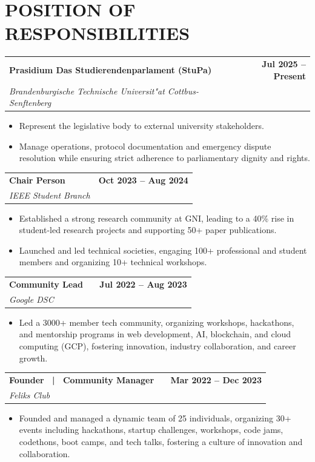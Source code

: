 \documentclass[a4paper,11pt]{article}
\makeatletter
\newcommand{\entryheader}[4]{%
  \begin{tabularx}{\textwidth}{@{}>{\RaggedRight\arraybackslash}X r@{}}
    \textbf{#1} & \textbf{#2} \\
    \textit{#3} & \textit{#4} \\
  \end{tabularx}%
}
\newenvironment{entrybullets}{%
  \begin{minipage}[t]{0.77\textwidth}
    \begin{itemize}[leftmargin=*,label=\textbullet,align=left]
}{%
    \end{itemize}
  \end{minipage}
}
\newcommand{\extlink}{\raisebox{0.2ex}{\scriptsize\faExternalLink*}}
\makeatother
\begin{document}
\section*{POSITION OF RESPONSIBILITIES}
\entryheader{Prasidium Das Studierendenparlament (StuPa)}{Jul 2025 -- Present}{Brandenburgische Technische Universit"at Cottbus-Senftenberg}{}
\begin{entrybullets}
  \item Represent the legislative body to external university stakeholders.
  \item Manage operations, protocol documentation and emergency dispute resolution while ensuring strict adherence to parliamentary dignity and rights.
\end{entrybullets}

\vspace{0.25cm}
\entryheader{Chair Person}{Oct 2023 -- Aug 2024}{IEEE Student Branch}{}
\begin{entrybullets}
  \item Established a strong research community at GNI, leading to a 40\% rise in student-led research projects and supporting 50+ paper publications.
  \item Launched and led technical societies, engaging 100+ professional and student members and organizing 10+ technical workshops.
\end{entrybullets}

\vspace{0.25cm}
\newpage
\thispagestyle{secondpage}

\entryheader{Community Lead \ \extlink}{Jul 2022 -- Aug 2023}{Google DSC}{}
\begin{entrybullets}
  \item Led a 3000+ member tech community, organizing workshops, hackathons, and mentorship programs in web development, AI, blockchain, and cloud computing (GCP), fostering innovation, industry collaboration, and career growth.
\end{entrybullets}

\vspace{0.25cm}
\entryheader{Founder \ | \ Community Manager \ \extlink}{Mar 2022 -- Dec 2023}{Feliks Club}{}
\begin{entrybullets}
  \item Founded and managed a dynamic team of 25 individuals, organizing 30+ events including hackathons, startup challenges, workshops, code jams, codethons, boot camps, and tech talks, fostering a culture of innovation and collaboration.
\end{entrybullets}
\end{document}
